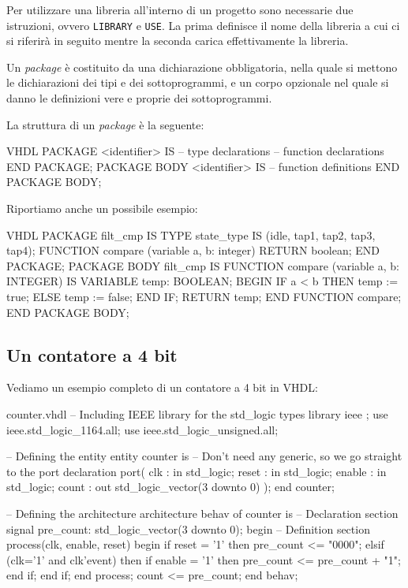 \documentclass[10pt,a4paper,oneside]{scrbook}
\begin{document}
Per utilizzare una libreria all'interno di un progetto sono necessarie due 
istruzioni, ovvero \texttt{LIBRARY} e \texttt{USE}.
La prima definisce il nome della libreria a cui ci si riferirà in seguito 
mentre la seconda carica effettivamente la libreria.

Un \textit{package} è costituito da una dichiarazione obbligatoria, nella quale 
si mettono le dichiarazioni dei tipi e dei sottoprogrammi, e un corpo opzionale 
nel quale si danno le definizioni vere e proprie dei sottoprogrammi.

La struttura di un \textit{package} è la seguente:
\begin{sourcecode}{VHDL}
PACKAGE <identifier> IS
    -- type declarations
    -- function declarations
END PACKAGE;
PACKAGE BODY <identifier> IS
    -- function definitions
END PACKAGE BODY;
\end{sourcecode}
Riportiamo anche un possibile esempio:
\begin{sourcecode}{VHDL}
PACKAGE filt_cmp IS
    TYPE state_type IS (idle, tap1, tap2, tap3, tap4);
    FUNCTION compare (variable a, b: integer) RETURN boolean;
END PACKAGE;
PACKAGE BODY filt_cmp IS
    FUNCTION compare (variable a, b: INTEGER) IS
        VARIABLE temp: BOOLEAN;
    BEGIN
        IF a < b THEN
            temp := true;
        ELSE
            temp := false;
        END IF;
        RETURN temp;
    END FUNCTION compare;
END PACKAGE BODY;
\end{sourcecode}

\subsection{Un contatore a 4 bit}
Vediamo un esempio completo di un contatore a 4 bit in VHDL:
\begin{vhdl}{counter.vhdl}
-- Including IEEE library for the std_logic types
library ieee ;
use ieee.std_logic_1164.all;
use ieee.std_logic_unsigned.all;

-- Defining the entity
entity counter is
    -- Don't need any generic, so we go straight to the port declaration
    port(
        clk     :  in   std_logic;
        reset   :  in   std_logic;
        enable  :  in   std_logic;
        count   :  out  std_logic_vector(3 downto 0)
    );
end counter;

-- Defining the architecture
architecture behav of counter is
    -- Declaration section       
    signal pre_count: std_logic_vector(3 downto 0);
begin
    -- Definition section
    process(clk, enable, reset)
    begin
        if reset = '1' then
            pre_count <= "0000";
        elsif (clk='1' and clk'event) then
            if enable = '1' then
              pre_count <= pre_count + "1";
            end if;
        end if;
    end process;  
    count <= pre_count;
end behav;
\end{vhdl}
\end{document}
